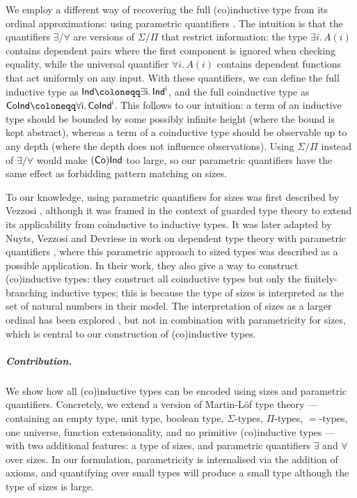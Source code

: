 We employ a different way of recovering the full (co)inductive type from its ordinal approximations: using parametric quantifiers \cite{reynolds1983types, parametric-quantifier, reldtt}.
The intuition is that the quantifiers \(\exists/\forall\) are versions of \(\Sigma/\Pi\) that restrict information: the type \(\exists i.\,A(i)\) contains dependent pairs where the first component is ignored when checking equality, while the universal quantifier \(\forall i.\,A(i)\) contains dependent functions that act uniformly on any input.
With these quantifiers, we can define the full inductive type as \(\sf{Ind}\coloneqq\exists i.\,\sf{Ind}^i\), and the full coinductive type as \(\sf{CoInd}\coloneqq\forall i.\,\sf{CoInd}^i\).
This follows to our intuition: a term of an inductive type should be bounded by some possibly infinite height (where the bound is kept abstract), whereas a term of a coinductive type should be observable up to any depth (where the depth does not influence observations). 
Using \(\Sigma/\Pi\) instead of \(\exists/\forall\) would make \((\sf{Co})\sf{Ind}\) too large, so our parametric quantifiers have the same effect as forbidding pattern matching on sizes.

To our knowledge, using parametric quantifiers for sizes was first described by Vezzosi \cite{licentiate}, although it was framed in the context of guarded type theory \cite{nakano,prod-coprogramming} to extend its applicability from coinductive to inductive types.
It was later adapted by Nuyts, Vezzosi and Devriese in work on dependent type theory with parametric quantifiers \cite{parametric-quantifier, reldtt}, where this parametric approach to sized types was described as a possible application. In their work, they also give a way to construct (co)inductive types: they construct all coinductive types but only the finitely-branching inductive types; this is because the type of sizes is interpreted as the set of natural numbers in their model.
The interpretation of sizes as a larger ordinal has been explored \cite{Abel2006TypebasedTA, Chan_2022}, but not in combination with parametricity for sizes, which is central to our construction of (co)inductive types.

\subparagraph*{Contribution.}
We show how all (co)inductive types can be encoded using sizes and parametric quantifiers.
Concretely, we extend a version of Martin-L\"of type theory --- containing an empty type, unit type, boolean type, \(\Sigma\)-types, \(\Pi\)-types, \(=\)-types, one universe, function extensionality, and no primitive (co)inductive types --- with two additional features: a type of sizes, and parametric quantifiers \(\exists\) and \(\forall\) over sizes.
In our formulation, parametricity is internalised via the addition of axioms, and quantifying over small types will produce a small type although the type of sizes is large.

